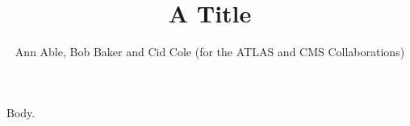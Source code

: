 \documentclass{article}
\begin{document}
\title{A Title}
\author{Ann Able, Bob Baker and Cid Cole (for the ATLAS and CMS Collaborations)}
\maketitle
Body.
\end{document}
